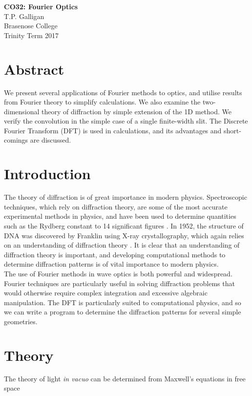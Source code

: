 \documentclass[a4paper,11pt]{article}
\begin{document}
\begin{center}
\Large{\textbf{CO32: Fourier Optics}}\\ 
\vspace{1em}
\large{T.P. Galligan}\\
\large{Brasenose College}\\
\large{Trinity Term 2017}
\end{center}
\section{Abstract}
We present several applications of Fourier methods to optics, and utilise results from Fourier theory to simplify calculations. We also examine the two-dimensional theory of diffraction by simple extension of the 1D method. We verify the convolution in the simple case of a single finite-width slit. The Discrete Fourier Transform (DFT) is used in calculations, and its advantages and short-comings are discussed. 

\section{Introduction}
The theory of diffraction is of great importance in modern physics. Spectroscopic techniques, which rely on diffraction theory, are some of the most accurate experimental methods in physics, and have been used to determine quantities such as the Rydberg constant to 14 significant figures \cite{rydbergwiki}. In 1952, the structure of DNA was discovered by Franklin using X-ray crystallography, which again relies on an understanding of diffraction theory \cite{franklin}. It is clear that an understanding of diffraction theory is important, and developing computational methods to determine diffraction patterns is of vital importance to modern physics.\\
The use of Fourier methods in wave optics is both powerful and widespread. Fourier techniques are particularly useful in solving diffraction problems that would otherwise require complex integration and excessive algebraic manipulation. The DFT is particularly suited to computational physics, and so we can write a program to determine the diffraction patterns for several simple geometries.

\section{Theory}
The theory of light \textit{in vacuo} can be determined from Maxwell's equations in free space \cite{hecht}
\end{document}
